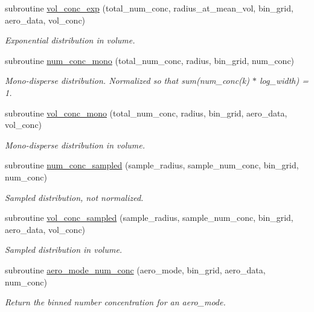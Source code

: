 \begin{DoxyCompactItemize}
subroutine \mbox{\hyperlink{namespacepmc__aero__mode_aa6ef6e2dc2790945150c453a171da9b5}{vol\+\_\+conc\+\_\+exp}} (total\+\_\+num\+\_\+conc, radius\+\_\+at\+\_\+mean\+\_\+vol, bin\+\_\+grid, aero\+\_\+data, vol\+\_\+conc)
\begin{DoxyCompactList}\small\item\em Exponential distribution in volume. \end{DoxyCompactList}\item 
subroutine \mbox{\hyperlink{namespacepmc__aero__mode_a234df72199670a154160bba53306c150}{num\+\_\+conc\+\_\+mono}} (total\+\_\+num\+\_\+conc, radius, bin\+\_\+grid, num\+\_\+conc)
\begin{DoxyCompactList}\small\item\em Mono-\/disperse distribution. Normalized so that sum(num\+\_\+conc(k) $\ast$ log\+\_\+width) = 1. \end{DoxyCompactList}\item 
subroutine \mbox{\hyperlink{namespacepmc__aero__mode_ad917c92b4e26574185aa1fa1de3ce361}{vol\+\_\+conc\+\_\+mono}} (total\+\_\+num\+\_\+conc, radius, bin\+\_\+grid, aero\+\_\+data, vol\+\_\+conc)
\begin{DoxyCompactList}\small\item\em Mono-\/disperse distribution in volume. \end{DoxyCompactList}\item 
subroutine \mbox{\hyperlink{namespacepmc__aero__mode_afd98aa0b0cb1ee7e41347a0162b7c2ee}{num\+\_\+conc\+\_\+sampled}} (sample\+\_\+radius, sample\+\_\+num\+\_\+conc, bin\+\_\+grid, num\+\_\+conc)
\begin{DoxyCompactList}\small\item\em Sampled distribution, not normalized. \end{DoxyCompactList}\item 
subroutine \mbox{\hyperlink{namespacepmc__aero__mode_a4526110f9b901d8cdcebdd9862ee9cb2}{vol\+\_\+conc\+\_\+sampled}} (sample\+\_\+radius, sample\+\_\+num\+\_\+conc, bin\+\_\+grid, aero\+\_\+data, vol\+\_\+conc)
\begin{DoxyCompactList}\small\item\em Sampled distribution in volume. \end{DoxyCompactList}\item 
subroutine \mbox{\hyperlink{namespacepmc__aero__mode_ab66d248f61d08547c4acd818f6a57dc2}{aero\+\_\+mode\+\_\+num\+\_\+conc}} (aero\+\_\+mode, bin\+\_\+grid, aero\+\_\+data, num\+\_\+conc)
\begin{DoxyCompactList}\small\item\em Return the binned number concentration for an aero\+\_\+mode. \end{DoxyCompactList}\item 

\end{DoxyCompactItemize}
